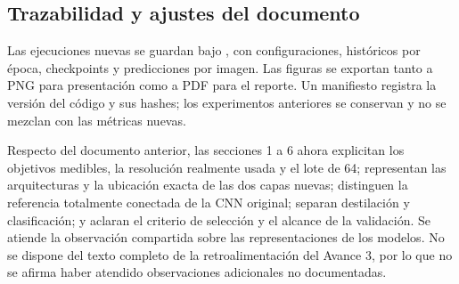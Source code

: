\subsection{Trazabilidad y ajustes del documento}

Las ejecuciones nuevas se guardan bajo , con
configuraciones, históricos por época, checkpoints y predicciones por imagen.
Las figuras se exportan tanto a PNG para presentación como a PDF para el reporte.
Un manifiesto registra la versión del código y sus hashes; los experimentos
anteriores se conservan y no se mezclan con las métricas nuevas.

Respecto del documento anterior, las secciones 1 a 6 ahora explicitan los
objetivos medibles, la resolución realmente usada y el lote de 64; representan
las arquitecturas y la ubicación exacta de las dos capas nuevas; distinguen la
referencia totalmente conectada de la CNN original; separan destilación y
clasificación; y aclaran el criterio de selección y el alcance de la validación.
Se atiende la observación compartida sobre las representaciones de los modelos.
No se dispone del texto completo de la retroalimentación del Avance 3, por lo que
no se afirma haber atendido observaciones adicionales no documentadas.
